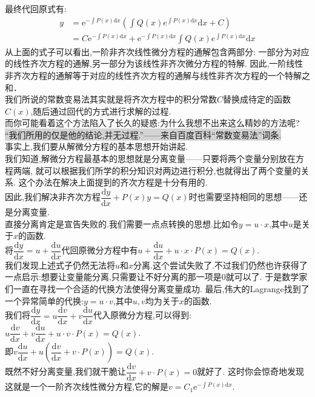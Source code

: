 \documentclass[a4paper,oneside]{ctexart}
\newcommand{\e}{\mathrm{e}}
\newcommand{\di}{\mathrm{d}}
\begin{document}
最终代回原式有:
$$\begin{aligned}
    y &= \e^{-\int{P(x)\di x}}\left(\int{Q(x)e^{\int{P(x)\di x}}\di x}+C\right) \\
      &= C\e^{-\int{P(x)\di x}}+\e^{-\int{P(x)\di x}}\int{Q(x)e^{\int{P(x)\di x}}\di x}
\end{aligned}$$
从上面的式子可以看出,一阶非齐次线性微分方程的通解包含两部分:
一部分为对应的线性齐次方程的通解,另一部分为该线性非齐次微分方程的特解.
因此,一阶线性非齐次方程的通解等于对应的线性齐次方程的通解与线性非齐次方程的一个特解之和．\\
我们所说的常数变易法其实就是将齐次方程中的积分常数$C$替换成待定的函数$C(x)$,随后通过回代的方式进行求解的过程.\\
而你可能看着这个方法陷入了长久的疑惑:为什么我想不出来这么精妙的方法呢?\\
\colorbox{lightgray}{“我们所用的仅是他的结论,并无过程.”——来自百度百科“常数变易法”词条.}\\
事实上,我们要从解微分方程的基本思想开始讲起.\\
我们知道,解微分方程最基本的思想就是分离变量——只要将两个变量分别放在方程两端,
就可以根据我们所学的积分知识对两边进行积分,也就得出了两个变量的关系.
这个办法在解决上面提到的齐次方程是十分有用的.\\
因此,我们解决非齐次方程$\dfrac{\di y}{\di x}+P(x)y=Q(x)$时也需要坚持相同的思想——还是分离变量.\\
直接分离肯定是宣告失败的.我们需要一点点转换的思想.比如令$y=u\cdot x$,其中$u$是关于$x$的函数.\\
将$\dfrac{\di y}{\di x}=u+\dfrac{\di u}{\di x}$代回原微分方程中有$u+\dfrac{\di u}{\di x}+u\cdot x\cdot P(x)=Q(x)$.\\
我们发现上述式子仍然无法将$u$和$x$分离.这个尝试失败了.不过我们仍然也许获得了一点启示:想要让变量能分离,只需要让不好分离的那一项是0就可以了.
于是数学家们一直在寻找一个合适的代换方法使得分离变量成功.
最后,伟大的Lagrange找到了一个异常简单的代换:$y=u\cdot v$,其中$u,v$均为关于$x$的函数.\\
我们将$\dfrac{\di y}{\di x}=u\dfrac{\di v}{\di x}+v\dfrac{\di u}{\di x}$代入原微分方程,可以得到:
$u\dfrac{\di v}{\di x}+v\dfrac{\di u}{\di x}+u\cdot v\cdot P(x)=Q(x)$.\\
即$v\dfrac{\di u}{\di x}+u\left(\dfrac{\di v}{\di x}+ v\cdot P(x)\right)=Q(x)$.\\
既然不好分离变量,我们就干脆让$\dfrac{\di v}{\di x}+ v\cdot P(x)=0$就好了.
这时你会惊奇地发现这就是一个一阶齐次线性微分方程,它的解是$v=C_1\e^{-\int{P(x)\di x}}$.\\
\end{document}
